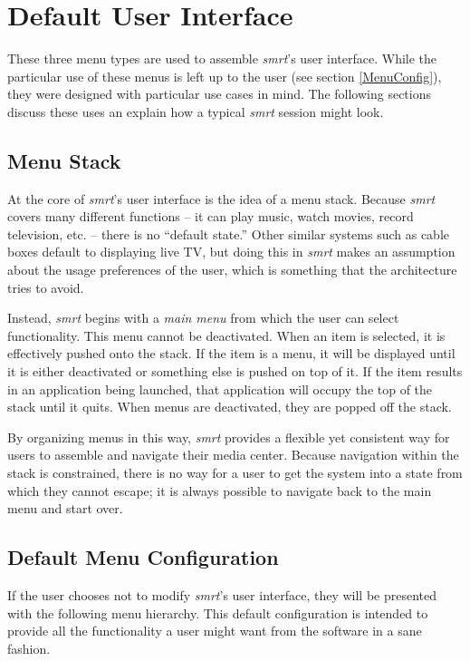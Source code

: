 \documentclass[letterpaper, titlepage, 11pt]{article}
\begin{document}
\section{Default User Interface}
\label{DefaultUI}
These three menu types are used to assemble \textit{smrt}'s user interface.
While the particular use of these menus is left up to the user (see
section \ref{MenuConfig}), they were designed with particular use cases in
mind.  The following sections discuss these uses an explain how a typical
\textit{smrt} session might look.

\subsection{Menu Stack}
At the core of \textit{smrt}'s user interface is the idea of a menu stack.
Because \textit{smrt} covers many different functions -- it can play music,
watch movies, record television, etc. -- there is no ``default state.''  Other
similar systems such as cable boxes default to displaying live TV, but doing
this in \textit{smrt} makes an assumption about the usage preferences of the
user, which is something that the architecture tries to avoid.

Instead, \textit{smrt} begins with a \textit{main menu} from which the user
can select functionality.  This menu cannot be deactivated.  When an item
is selected, it is effectively pushed onto the stack.  If the item is a menu,
it will be displayed until it is either deactivated or something else is
pushed on top of it.  If the item results in an application being launched,
that application will occupy the top of the stack until it quits.  When menus
are deactivated, they are popped off the stack.

By organizing menus in this way, \textit{smrt} provides a flexible yet
consistent way for users to assemble and navigate their media center.  Because
navigation within the stack is constrained, there is no way for a user to
get the system into a state from which they cannot escape; it is always
possible to navigate back to the main menu and start over.

\subsection{Default Menu Configuration}
If the user chooses not to modify \textit{smrt}'s user interface, they will be
presented with the following menu hierarchy. This default configuration is
intended to provide all the functionality a user might want from the software in
a sane fashion.
\end{document}
